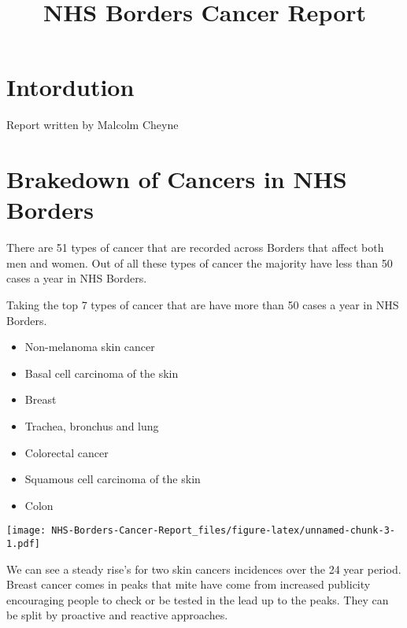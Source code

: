 \documentclass[
]{article}
\title{NHS Borders Cancer Report}
\author{}
\date{\vspace{-2.5em}}
\providecommand{\tightlist}{%
  \setlength{\itemsep}{0pt}\setlength{\parskip}{0pt}}
\begin{document}
\maketitle

\hypertarget{intordution}{%
\section{Intordution}\label{intordution}}

Report written \n by \n Malcolm Cheyne

\hypertarget{brakedown-of-cancers-in-nhs-borders}{%
\section{Brakedown of Cancers in NHS
Borders}\label{brakedown-of-cancers-in-nhs-borders}}

There are 51 types of cancer that are recorded across Borders that
affect both men and women. Out of all these types of cancer the majority
have less than 50 cases a year in NHS Borders.

Taking the top 7 types of cancer that are have more than 50 cases a year
in NHS Borders.

\begin{itemize}
\tightlist
\item
  Non-melanoma skin cancer\\
\item
  Basal cell carcinoma of the skin\\
\item
  Breast\\
\item
  Trachea, bronchus and lung\\
\item
  Colorectal cancer\\
\item
  Squamous cell carcinoma of the skin\\
\item
  Colon
\end{itemize}

\texttt{[image: NHS-Borders-Cancer-Report\_files/figure-latex/unnamed-chunk-3-1.pdf]}

We can see a steady rise's for two skin cancers incidences over the 24
year period. Breast cancer comes in peaks that mite have come from
increased publicity encouraging people to check or be tested in the lead
up to the peaks. They can be split by proactive and reactive approaches.
\end{document}
